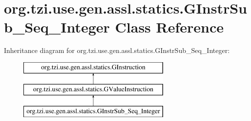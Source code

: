 \hypertarget{classorg_1_1tzi_1_1use_1_1gen_1_1assl_1_1statics_1_1_g_instr_sub___seq___integer}{\section{org.\-tzi.\-use.\-gen.\-assl.\-statics.\-G\-Instr\-Sub\-\_\-\-Seq\-\_\-\-Integer Class Reference}
\label{classorg_1_1tzi_1_1use_1_1gen_1_1assl_1_1statics_1_1_g_instr_sub___seq___integer}
}
Inheritance diagram for org.\-tzi.\-use.\-gen.\-assl.\-statics.\-G\-Instr\-Sub\-\_\-\-Seq\-\_\-\-Integer\-:\begin{figure}[H]
\begin{center}
\leavevmode
\includegraphics[height=3.000000cm]{classorg_1_1tzi_1_1use_1_1gen_1_1assl_1_1statics_1_1_g_instr_sub___seq___integer}
\end{center}
\end{figure}
